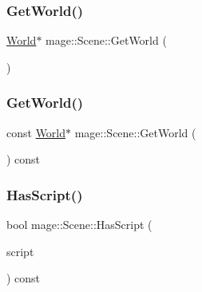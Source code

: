 \subsubsection{\texorpdfstring{Get\+World()}{GetWorld()}\hspace{0.1cm}{\footnotesize\ttfamily [1/2]}}
{\footnotesize\ttfamily \hyperlink{classmage_1_1_world}{World}$\ast$ mage\+::\+Scene\+::\+Get\+World (\begin{DoxyParamCaption}{ }\end{DoxyParamCaption})}

\hypertarget{classmage_1_1_scene_a0438504884c566e0d6264436b78ee764}{}\label{classmage_1_1_scene_a0438504884c566e0d6264436b78ee764} 
\subsubsection{\texorpdfstring{Get\+World()}{GetWorld()}\hspace{0.1cm}{\footnotesize\ttfamily [2/2]}}
{\footnotesize\ttfamily const \hyperlink{classmage_1_1_world}{World}$\ast$ mage\+::\+Scene\+::\+Get\+World (\begin{DoxyParamCaption}{ }\end{DoxyParamCaption}) const}

\hypertarget{classmage_1_1_scene_a31469e19b181d0cb08bf10c554d28a6d}{}\label{classmage_1_1_scene_a31469e19b181d0cb08bf10c554d28a6d} 
\subsubsection{\texorpdfstring{Has\+Script()}{HasScript()}}
{\footnotesize\ttfamily bool mage\+::\+Scene\+::\+Has\+Script (\begin{DoxyParamCaption}\item[{const \hyperlink{namespacemage_a1e01ae66713838a7a67d30e44c67703e}{Shared\+Ptr}$<$ \hyperlink{classmage_1_1_behavior_script}{Behavior\+Script} $>$}]{script }\end{DoxyParamCaption}) const}

\hypertarget{classmage_1_1_scene_a3cd12ef381ca743bf0b8f8aa2a76eb57}{}\label{classmage_1_1_scene_a3cd12ef381ca743bf0b8f8aa2a76eb57} 
